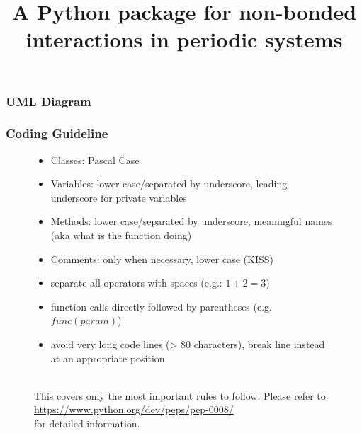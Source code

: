 \documentclass[10pt, compress]{beamer}
\title{A Python package for non-bonded interactions in periodic systems}
\institute{FU Berlin}
\begin{document}
\maketitle



\begin{frame}[fragile]
	\frametitle{UML Diagram}
    
\end{frame}

\begin{frame}[fragile]
	\frametitle{Coding Guideline}
	\begin{figure}
    	\begin{itemize}
    		\item Classes: Pascal Case
            \item Variables: lower case/separated by underscore, leading underscore for private variables
            \item Methods: lower case/separated by underscore, meaningful names (aka what is the function doing)
            \item Comments: only when necessary, lower case (KISS)
            \item separate all operators with spaces (e.g.: $1 + 2 = 3$)
            \item function calls directly followed by parentheses (e.g. $func(param)$)
            \item avoid very long code lines (> 80 characters), break line instead at an appropriate position
    	\end{itemize}
        \ \\
        This covers only the most important rules to follow. Please refer to 
        \url{https://www.python.org/dev/peps/pep-0008/} \\
        for detailed information.
	\end{figure}
\end{frame}
\end{document}
